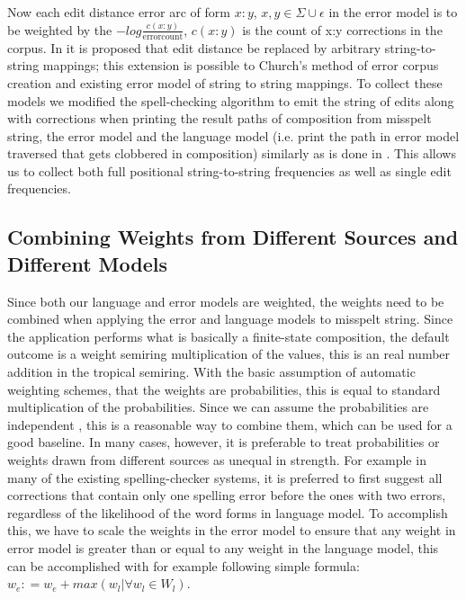 \documentclass[a4paper,12pt]{article}
\begin{document}
Now each edit distance error arc of form $x:y$, $x, y \in \Sigma \cup
{\epsilon}$ in the error model is to be weighted by the $-log
\frac{c(x:y)}{\mathrm{error count}}$, $c(x:y)$ is the count of x:y corrections
in the corpus. In \cite{brill2000improved} it is proposed that edit distance be
replaced by arbitrary string-to-string mappings; this extension is possible to
Church's method of error corpus creation and existing error model of string to
string mappings. To collect these models we modified the spell-checking
algorithm to emit the string of edits along with corrections when printing the
result paths of composition from misspelt string, the error model and the
language model (i.e. print the path in error model traversed that gets
clobbered in composition) similarly as is done in \cite{ristad1998learning}.
This allows us to collect both full positional string-to-string frequencies as
well as single edit frequencies.

\subsection{Combining Weights from Different Sources and Different Models}
\label{subsec:combining-weights}

Since both our language and error models are weighted, the weights need to be
combined when applying the error and language models to misspelt string. Since
the application performs what is basically a finite-state composition, the
default outcome is a weight semiring multiplication of the values, this is an
real number addition in the tropical semiring. With the basic assumption of
automatic weighting schemes, that the weights are probabilities, this is equal
to standard multiplication of the probabilities. Since we can assume the
probabilities are independent \cite[]{church1991probability}, this is a
reasonable way to combine them, which can be used for a good baseline. In many
cases, however, it is preferable to treat probabilities or weights drawn from
different sources as unequal in strength. For example in many of the existing
spelling-checker systems, it is preferred to first suggest all corrections that
contain only one spelling error before the ones with two errors, regardless of
the likelihood of the word forms in language model. To accomplish this, we have
to scale the weights in the error model to ensure that any weight in error
model is greater than or equal to any weight in the language model, this can be
accomplished with for example following simple formula: $w_e
\mathrel{\mathop:}= w_e + max(w_l | \forall w_l \in W_l)$.
\end{document}
